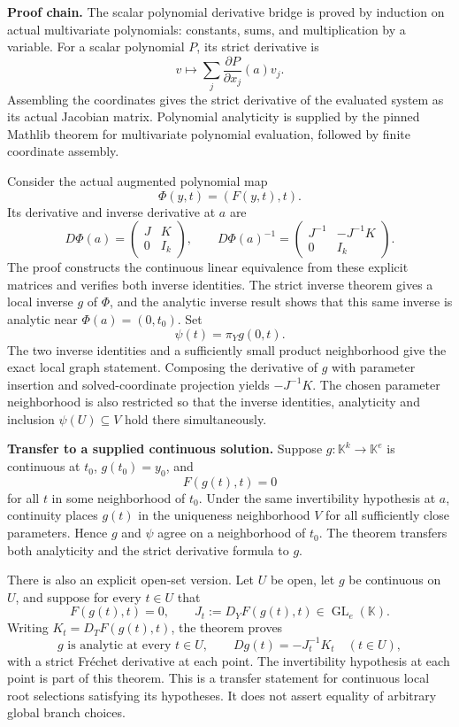 \textbf{Proof chain.} The scalar polynomial derivative bridge is proved
by induction on actual multivariate polynomials: constants, sums, and
multiplication by a variable. For a scalar polynomial \(P\), its strict
derivative is \[
v\longmapsto\sum_j \frac{\partial P}{\partial x_j}(a)v_j.
\] Assembling the coordinates gives the strict derivative of the
evaluated system as its actual Jacobian matrix. Polynomial analyticity
is supplied by the pinned Mathlib theorem for multivariate polynomial
evaluation, followed by finite coordinate assembly.

Consider the actual augmented polynomial map \[
\Phi(y,t)=(F(y,t),t).
\] Its derivative and inverse derivative at \(a\) are \[
D\Phi(a)=
\begin{pmatrix}J&K\\0&I_k\end{pmatrix},
\qquad
D\Phi(a)^{-1}=
\begin{pmatrix}J^{-1}&-J^{-1}K\\0&I_k\end{pmatrix}.
\] The proof constructs the continuous linear equivalence from these
explicit matrices and verifies both inverse identities. The strict
inverse theorem gives a local inverse \(g\) of \(\Phi\), and the
analytic inverse result shows that this same inverse is analytic near
\(\Phi(a)=(0,t_0)\). Set \[
\psi(t)=\pi_Y g(0,t).
\] The two inverse identities and a sufficiently small product
neighborhood give the exact local graph statement. Composing the
derivative of \(g\) with parameter insertion and solved-coordinate
projection yields \(-J^{-1}K\). The chosen parameter neighborhood is
also restricted so that the inverse identities, analyticity and
inclusion \(\psi(U)\subseteq V\) hold there simultaneously.

\textbf{Transfer to a supplied continuous solution.} Suppose
\(g:\mathbb K^k\to\mathbb K^e\) is continuous at \(t_0\),
\(g(t_0)=y_0\), and \[
F(g(t),t)=0
\] for all \(t\) in some neighborhood of \(t_0\). Under the same
invertibility hypothesis at \(a\), continuity places \(g(t)\) in the
uniqueness neighborhood \(V\) for all sufficiently close parameters.
Hence \(g\) and \(\psi\) agree on a neighborhood of \(t_0\). The theorem
 transfers both analyticity
and the strict derivative formula to \(g\).

There is also an explicit open-set version. Let \(U\) be open, let \(g\)
be continuous on \(U\), and suppose for every \(t\in U\) that \[
F(g(t),t)=0,
\qquad
J_t:=D_YF(g(t),t)\in\operatorname{GL}_e(\mathbb K).
\] Writing \(K_t=D_TF(g(t),t)\), the theorem
 proves \[
g\text{ is analytic at every }t\in U,
\qquad Dg(t)=-J_t^{-1}K_t\quad(t\in U),
\] with a strict Fréchet derivative at each point. The invertibility hypothesis at each point is part of this theorem. This is a transfer
statement for continuous local root selections satisfying its
hypotheses. It does not assert equality of arbitrary global branch
choices.

